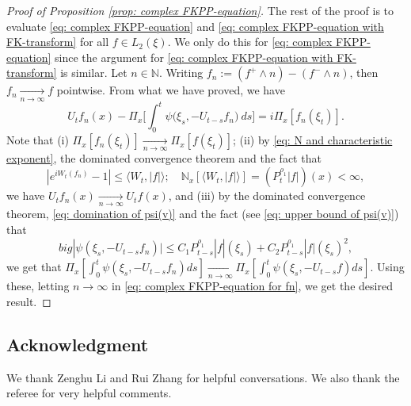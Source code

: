 \documentclass[12pt,a4paper]{amsart}
\theoremstyle{plain}
\theoremstyle{definition}
\numberwithin{equation}{section}
\begin{document}
\begin{proof}[Proof of Proposition \ref{prop: complex FKPP-equation}]
The rest of the proof is to evaluate \eqref{eq: complex FKPP-equation} and \eqref{eq: complex FKPP-equation with FK-transform} for all $f\in L_2(\xi)$. We only do this for \eqref{eq: complex FKPP-equation} since the argument for \eqref{eq: complex FKPP-equation with FK-transform} is similar.
Let $n \in \mathbb N$.
Writing $f_n := (f^+ \wedge n) - (f^- \wedge n)$, then $f_n \xrightarrow[n\to \infty]{} f$ pointwise.
From what we have proved, we have
\begin{equation}
  \label{eq: complex FKPP-equation for fn}
  U_tf_n(x) - \Pi_{x} \Big[\int_0^t \psi\big(\xi_s, - U_{t-s}f_n\big) ~ds\Big]
  = i \Pi_{x} [f_n(\xi_t)].
\end{equation}
Note that
(i) $\Pi_{x}[f_n(\xi_t)] \xrightarrow[n\to \infty]{} \Pi_{x}[f(\xi_t)]$;
(ii) by \eqref{eq: N and characteristic exponent}, the dominated convergence theorem and the fact that
\[
  |e^{i W_t(f_n)} - 1| \leq \langle W_t, |f|\rangle;
  \quad \mathbb N_x[\langle W_t, |f|\rangle] = (P_t^{\rho_1} |f|)(x) < \infty,
\]
we have $U_tf_n(x) \xrightarrow[n\to \infty]{} U_tf(x)$, and (iii) by the dominated convergence theorem, \eqref{eq: domination of psi(v)} and the fact (see \eqref{eq: upper bound of psi(v)}) that
\[
  big|\psi(\xi_s,- U_{t-s}f_n)\big|
  \leq C_1 P_{t-s}^{\rho_1}|f|(\xi_s)+C_2 P_{t-s}^{\rho_1}|f|(\xi_s)^2,
\]
we get that $\Pi_{x} [\int_0^t \psi(\xi_s,- U_{t-s}f_n)ds] \xrightarrow[n\to \infty]{} \Pi_{x} [\int_0^t \psi(\xi_s,- U_{t-s}f)ds]$.
Using these, letting $n \to \infty$ in \eqref{eq: complex FKPP-equation for fn}, we get the desired result.
\end{proof}

\subsection*{Acknowledgment}
We thank Zenghu Li and Rui Zhang for helpful conversations.
We also thank the referee for very helpful comments.
\end{document}
